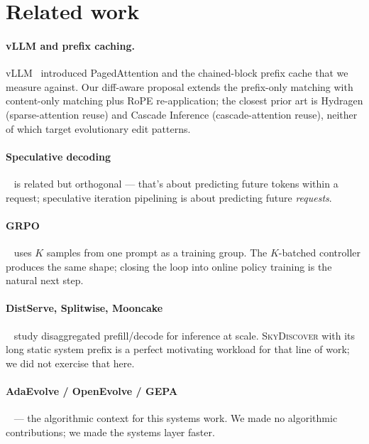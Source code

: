 \documentclass[11pt]{article}
\newcommand{\skyd}{\textsc{SkyDiscover}}
\newcommand{\adaev}{AdaEvolve}
\begin{document}
\section{Related work}
\label{sec:related}

\paragraph{vLLM and prefix caching.}
vLLM~\cite{vllm2023} introduced PagedAttention and the chained-block
prefix cache that we measure against. Our diff-aware proposal extends
the prefix-only matching with content-only matching plus RoPE
re-application; the closest prior art is Hydragen (sparse-attention
reuse) and Cascade Inference (cascade-attention reuse), neither of
which target evolutionary edit patterns.

\paragraph{Speculative decoding}~\cite{specdecoding2023} is related
but orthogonal --- that's about predicting future tokens within a
request; speculative iteration pipelining is about predicting future
\emph{requests}.

\paragraph{GRPO}~\cite{deepseekr1} uses $K$ samples from one prompt
as a training group. The $K$-batched controller produces the same
shape; closing the loop into online policy training is the natural
next step.

\paragraph{DistServe, Splitwise, Mooncake}~\cite{distserve,splitwise,mooncake}
study disaggregated prefill/decode for inference at scale. \skyd{}
with its long static system prefix is a perfect motivating workload
for that line of work; we did not exercise that here.

\paragraph{\adaev{} / OpenEvolve / GEPA}~\cite{alphaevolve,funsearch}
--- the algorithmic context for this systems work. We made no
algorithmic contributions; we made the systems layer faster.
\end{document}
